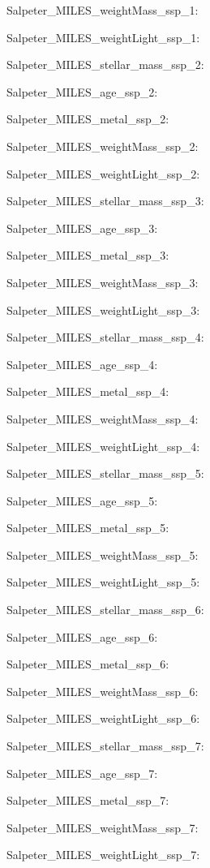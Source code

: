 \item Salpeter\_MILES\_weightMass\_ssp\_1: 
\item Salpeter\_MILES\_weightLight\_ssp\_1: 
\item Salpeter\_MILES\_stellar\_mass\_ssp\_2: 
\item Salpeter\_MILES\_age\_ssp\_2: 
\item Salpeter\_MILES\_metal\_ssp\_2: 
\item Salpeter\_MILES\_weightMass\_ssp\_2: 
\item Salpeter\_MILES\_weightLight\_ssp\_2: 
\item Salpeter\_MILES\_stellar\_mass\_ssp\_3: 
\item Salpeter\_MILES\_age\_ssp\_3: 
\item Salpeter\_MILES\_metal\_ssp\_3: 
\item Salpeter\_MILES\_weightMass\_ssp\_3: 
\item Salpeter\_MILES\_weightLight\_ssp\_3: 
\item Salpeter\_MILES\_stellar\_mass\_ssp\_4: 
\item Salpeter\_MILES\_age\_ssp\_4: 
\item Salpeter\_MILES\_metal\_ssp\_4: 
\item Salpeter\_MILES\_weightMass\_ssp\_4: 
\item Salpeter\_MILES\_weightLight\_ssp\_4: 
\item Salpeter\_MILES\_stellar\_mass\_ssp\_5: 
\item Salpeter\_MILES\_age\_ssp\_5: 
\item Salpeter\_MILES\_metal\_ssp\_5: 
\item Salpeter\_MILES\_weightMass\_ssp\_5: 
\item Salpeter\_MILES\_weightLight\_ssp\_5: 
\item Salpeter\_MILES\_stellar\_mass\_ssp\_6: 
\item Salpeter\_MILES\_age\_ssp\_6: 
\item Salpeter\_MILES\_metal\_ssp\_6: 
\item Salpeter\_MILES\_weightMass\_ssp\_6: 
\item Salpeter\_MILES\_weightLight\_ssp\_6: 
\item Salpeter\_MILES\_stellar\_mass\_ssp\_7: 
\item Salpeter\_MILES\_age\_ssp\_7: 
\item Salpeter\_MILES\_metal\_ssp\_7: 
\item Salpeter\_MILES\_weightMass\_ssp\_7: 
\item Salpeter\_MILES\_weightLight\_ssp\_7: 
